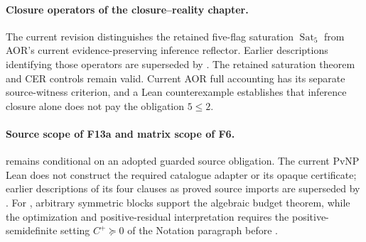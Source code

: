 \paragraph{Closure operators of the closure--reality chapter.}
The current revision distinguishes the retained five-flag saturation
\(\operatorname{Sat}_5\) from AOR's current evidence-preserving inference
reflector. Earlier descriptions identifying those operators are superseded
by . The retained saturation theorem
and CER controls remain valid. Current AOR full accounting has its separate
source-witness criterion, and a Lean counterexample establishes that inference
closure alone does not pay the obligation \(5\le2\).

\paragraph{Source scope of F13a and matrix scope of F6.}
 remains conditional on an adopted guarded source obligation.
The current PvNP Lean does not construct the required catalogue adapter
or its opaque certificate; earlier descriptions of its four clauses as
proved source imports are superseded by
.
For , arbitrary symmetric blocks support the algebraic budget
theorem, while the optimization and positive-residual interpretation
requires the positive-semidefinite setting \(C^{+}\succeq0\) of the
Notation paragraph before .
